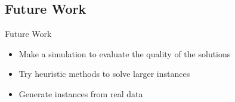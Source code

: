 
\subsection{Future Work}
\begin{frame}{Future Work}
  \begin{itemize}
  \item Make a simulation to evaluate the quality of the solutions
  \item Try heuristic methods to solve larger instances
  \item Generate instances from real data
  \end{itemize}
\end{frame}
